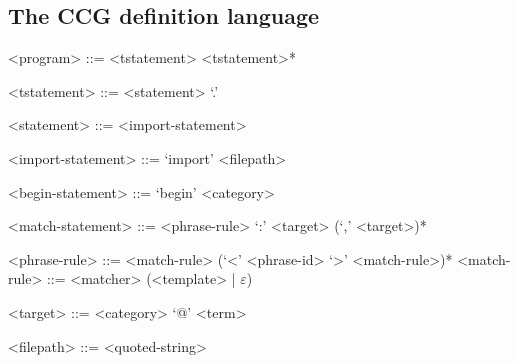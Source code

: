 \documentclass[main.tex]{subfiles}
\begin{document}
\subsection{The CCG definition language}
\begin{grammar}
    <program> ::= <tstatement> <tstatement>*

    <tstatement> ::= <statement> `.'

    <statement>  ::= <import-statement>

    <import-statement> ::= `import' <filepath>

    <begin-statement>  ::= `begin' <category>

    <match-statement>  ::= <phrase-rule> `:' <target> (`,' <target>)*

    <phrase-rule> ::= <match-rule> (`<' <phrase-id> `>' <match-rule>)*
    <match-rule> ::= <matcher> (<template> | $\varepsilon$)

    <target> ::= <category> `@' <term>

    <filepath> ::= <quoted-string>
\end{grammar}
\end{document}
